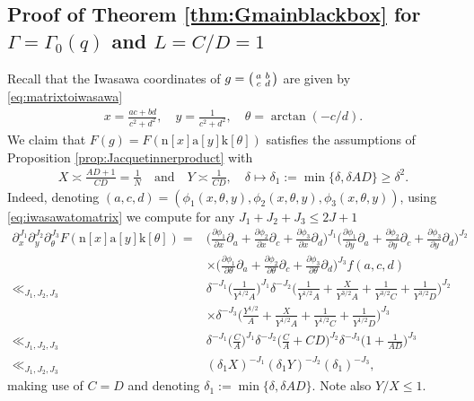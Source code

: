 \documentclass[12pt]{amsart}
\theoremstyle{definition}
\theoremstyle{remark}
\numberwithin{equation}{section}
\newcommand{\1}{{\mathbf 1}}
\renewcommand{\a}{\mathrm{a}}
\newcommand{\n}{\mathrm{n}}
\renewcommand{\k}{\mathrm{k}}
\renewcommand{\n}{\mathrm{n}}
\begin{document}
\subsection{Proof of Theorem \ref{thm:Gmainblackbox} for $\Gamma=\Gamma_0(q)$ and $L=C/D=1$}
Recall that the Iwasawa coordinates of $g = \smqty(a & b \\ c & d)$ are given by \eqref{eq:matrixtoiwasawa}
 \begin{align*}
     x= \frac{ac+bd}{c^2+d^2}, \quad y = \frac{1}{c^2+d^2}, \quad \theta = \arctan(-c/d).
 \end{align*}
 We claim that $F(g) =F(\n[x]\a[y]\k[\theta])$ satisfies the assumptions of Proposition \ref{prop:Jacquetinnerproduct} with
 \begin{align*}
     X \asymp\frac{AD +1}{CD} = \frac{1}{N}\quad \text{and} \quad Y \asymp \frac{1}{CD}, \quad \delta \mapsto \delta_1 := \min \{\delta,\delta AD \} \geq \delta^2. 
 \end{align*}
 Indeed, denoting $(a,c,d)=(\phi_1(x,\theta,y),\phi_2(x,\theta,y),\phi_3(x,\theta,y))$, using \eqref{eq:iwasawatomatrix} we compute for any $J_1+J_2+J_3 \leq 2J+1$
\begin{align*}
      \partial_x^{J_1} \partial_y^{J_2}  \partial_\theta^{J_3} F(\n[x]\a[y]\k[\theta]) = &\bigg(\frac{\partial \phi_1}{\partial x} \partial_a +\frac{\partial \phi_2}{\partial x} \partial_c +\frac{\partial \phi_3}{\partial x} \partial_d \bigg)^{J_1} \bigg(\frac{\partial \phi_1}{\partial y} \partial_a +\frac{\partial \phi_2}{\partial y} \partial_c +\frac{\partial \phi_3}{\partial y} \partial_d \bigg)^{J_2}  \\
      & \times \bigg(\frac{\partial \phi_1}{\partial \theta} \partial_a +\frac{\partial \phi_2}{\partial  \theta} \partial_c +\frac{\partial \phi_3}{\partial  \theta} \partial_d \bigg)^{J_3}f(a,c,d) \\
      \ll_{J_1,J_2,J_3} & \delta^{-J_1}\bigg(  \frac{1}{Y^{1/2}   A }\bigg)^{J_1} \delta^{-J_2}\bigg(\frac{1}{Y^{1/2}  A} + \frac{X}{Y^{3/2} A } + \frac{1}{Y^{3/2} C} +\frac{1}{Y^{3/2} D}\bigg)^{J_2} \\
      & \times \delta^{-J_3}\bigg( \frac{Y^{1/2}}{A} + \frac{X}{Y^{1/2} A} + \frac{1}{Y^{1/2} C} + \frac{1}{Y^{1/2} D} \bigg)^{J_3}
      \\ 
      \ll_{J_1,J_2,J_3} &\delta^{-J_1} \bigg( \frac{C}{A} \bigg)^{J_1} \delta^{-J_2}\bigg( \frac{C}{A} + CD \bigg)^{J_2}  \delta^{-J_3}\bigg( 1 + \frac{1}{AD} \bigg)^{J_3}
      \\
     \ll_{J_1,J_2,J_3} & (\delta_1  X)^{-J_1} (\delta_1 Y)^{-J_2} (\delta_1)^{-J_3},
\end{align*}
making use of $C =D$ and denoting $\delta_1 := \min \{\delta,\delta AD \}$. Note also $Y/X \leq 1$.
\end{document}
